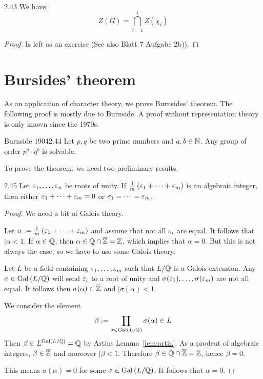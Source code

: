 \documentclass[twoside = false,	%
		headsepline,		%
		parskip = true,
		]{scrbook}						%
\begin{document}
        \begin{proposition}{}{2.43}
            We have:
            $$Z(G)=\bigcap_{i=1}^t Z(\chi_i)$$
        \end{proposition}
        \begin{proof}
            Is left as an exercise (See also Blatt 7 Aufgabe 2b)).
        \end{proof}
    
\section{Bursides' theorem}
    As an application of character theory, we prove Burnsides' theorem. The following proof is mostly due to Burnside. A proof without representation theory is only known since the 1970s.
    
    \begin{theorem}{Burnside 1904}{2.44}
        Let $p,q$ be two prime numbers and $a,b \in \mathbb N$. Any group of order $p^a \cdot q^b$ is solvable.
    \end{theorem}

    To prove the theorem, we need two preliminary results.
    
    \begin{lemma}{}{2.45}
        Let $\varepsilon_1,\dots,\varepsilon_n$ be roots of unity. If $\frac{1}{m}\left( \varepsilon_1 + \dots + \varepsilon_m \right)$ is an algebraic integer,
        then either $\varepsilon_1 + \dots + \varepsilon_m = 0$ or $\varepsilon_1 = \dots = \varepsilon_m$.
    \end{lemma}

    \begin{proof}
        We need a bit of Galois theory.

        Let $\alpha:= \frac{1}{m}\left( \varepsilon_1 + \dots + \varepsilon_m \right)$ and assume that not all $\varepsilon_i$ are equal.
        It 
        follows that $\vert{\alpha} < 1$. If $\alpha \in \mathbb Q$, then $\alpha \in \mathbb Q \cap \overline{\mathbb Z} = \mathbb Z$, which implies that $\alpha = 0$.
        But this is not always the case, so we have to use some Galois theory.

        Let $L$ be a field containing $\varepsilon_1,\dots,\varepsilon_m$ such that $L/\mathbb Q$ is a Galois extension. Any $\sigma \in \mathrm{Gal}\left( L/\mathbb Q\right)$ will send $\varepsilon_i$ to a root of unity and
        $\sigma(\varepsilon_1),\dots,\sigma(\varepsilon_m)$ are not all equal. It follows then $\sigma(\alpha) \in \overline{\mathbb Z}$ and $\vert{\sigma(\alpha)} < 1$.

        We consider the element
        \begin{equation*}
            \beta := \prod_{\sigma \in \mathrm{Gal}\left( L/\mathbb Q\right)} \sigma(\alpha) \in L
        \end{equation*}
        Then $\beta \in L^{\mathrm{Gal}\left( L/\mathbb Q\right)} = \mathbb Q $ by Artins Lemma~\ref{lem:artin}. As a prodcut of algebraic integers, $\beta \in \overline{\mathbb Z}$ and moreover $\vert{\beta} < 1$.
        Therefore $\beta \in \mathbb Q \cap \overline{\mathbb Z} = \mathbb Z$, hence $\beta = 0$.

        This means $\sigma(\alpha) = 0$ for some $\sigma \in \mathrm{Gal}\left( L/\mathbb Q\right)$. It follows that $\alpha = 0$.
    \end{proof}
\end{document}
